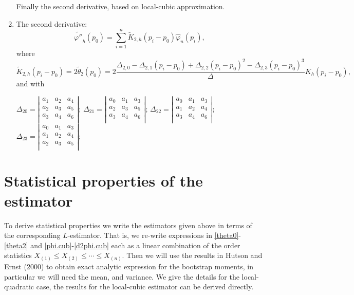 \documentclass[preprint,12pt]{elsarticle}
\begin{document}
\begin{enumerate}
Finally the second derivative, based on local-cubic approximation.
\item The second derivative:%
\begin{equation}\label{d2phi.cub}
\widetilde{\varphi''}_h(p_0)= \sum_{i=1}^n \widetilde{K}_{2,h}\left(p_i-p_0\right) \widehat{\varphi}_n\left(p_i\right),
\end{equation}
where 
\[
\widetilde{K}_{2,h}\left(p_i-p_0\right)=2\widetilde{\theta}_2(p_0)=2 \frac{\Delta_{2,0}-\Delta_{2,1}\left(p_i-p_0 \right)+\Delta_{2,2}\left(p_i-p_0 \right)^2-\Delta_{2,3}\left(p_i-p_0 \right)^3}{\Delta} K_h\left(p_i-p_0\right),
\]
and with
\begin{center}
$
\Delta_{20}=\left|\begin{array}{ccc}
a_1 & a_2 &a_4 \\ 
a_{2} & a_3 &a_{5}\\
 a_3 &a_4 &a_6 \\ 
\end{array}\right|$;   $\Delta_{21}=\left|\begin{array}{ccc}
a_0 & a_1 &a_3 \\ 
a_{2} & a_3 &a_{5}\\
 a_3 &a_4 &a_6 \\ 
\end{array}\right|$; $\Delta_{22}=\left|\begin{array}{ccc}
a_0 & a_1 &a_3 \\ 
a_{1} & a_2 &a_{4}\\
 a_3 &a_4 &a_6 \\ 
\end{array}\right|$;  $\Delta_{23}=\left|\begin{array}{ccc}
a_0 & a_1 &a_3 \\ 
a_{1} & a_2 &a_{4}\\
 a_2 &a_3 &a_5 \\ 
\end{array}\right|$;
\end{center}
\end{enumerate}



\bigskip
\section{Statistical properties of the estimator}
\noindent To derive statistical properties we write the estimators given above in terms of the corresponding $L$-estimator. That is, we re-write expressions in \eqref{theta0}-\eqref{theta2} and \eqref{phi.cub}-\eqref{d2phi.cub} each as a linear combination of the order statistics $X_{(1)} \leq X_{(2)} \leq \cdots \leq X_{(n)}$. Then we will use the results in Hutson and Ernst (2000) to obtain exact analytic expression for the bootstrap moments, in particular we will need the mean, and variance. 
We give the details for the local-quadratic case, the results for the local-cubic estimator can be derived directly.
\end{document}
